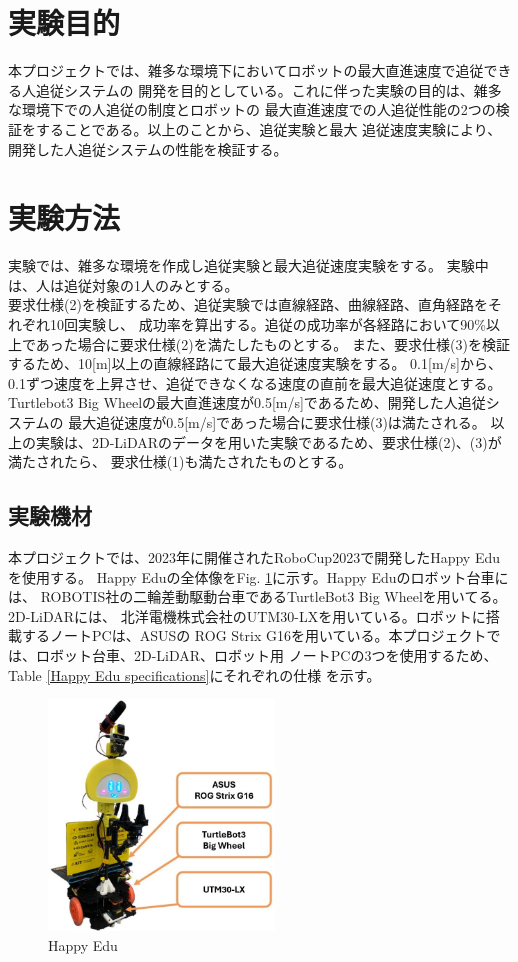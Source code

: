 \section{実験目的}
本プロジェクトでは、雑多な環境下においてロボットの最大直進速度で追従できる人追従システムの
開発を目的としている。これに伴った実験の目的は、雑多な環境下での人追従の制度とロボットの
最大直進速度での人追従性能の2つの検証をすることである。以上のことから、追従実験と最大
追従速度実験により、開発した人追従システムの性能を検証する。

\section{実験方法}
実験では、雑多な環境を作成し追従実験と最大追従速度実験をする。
実験中は、人は追従対象の1人のみとする。\\ \indent
要求仕様(2)を検証するため、追従実験では直線経路、曲線経路、直角経路をそれぞれ10回実験し、
成功率を算出する。追従の成功率が各経路において90\%以上であった場合に要求仕様(2)を満たしたものとする。
また、要求仕様(3)を検証するため、10[m]以上の直線経路にて最大追従速度実験をする。
0.1[m/s]から、0.1ずつ速度を上昇させ、追従できなくなる速度の直前を最大追従速度とする。
Turtlebot3 Big Wheelの最大直進速度が0.5[m/s]であるため、開発した人追従システムの
最大追従速度が0.5[m/s]であった場合に要求仕様(3)は満たされる。
以上の実験は、2D-LiDARのデータを用いた実験であるため、要求仕様(2)、(3)が満たされたら、
要求仕様(1)も満たされたものとする。

\subsection{実験機材}
本プロジェクトでは、2023年に開催されたRoboCup2023で開発したHappy Eduを使用する。
Happy Eduの全体像をFig. \ref{Happy Edu}に示す。Happy Eduのロボット台車には、
ROBOTIS社の二輪差動駆動台車であるTurtleBot3 Big Wheelを用いてる。2D-LiDARには、
北洋電機株式会社のUTM30-LXを用いている。ロボットに搭載するノートPCは、ASUSの
ROG Strix G16を用いている。本プロジェクトでは、ロボット台車、2D-LiDAR、ロボット用
ノートPCの3つを使用するため、Table \ref{Happy Edu specifications}にそれぞれの仕様
を示す。

\begin{figure}[h]
  \begin{center}
  \includegraphics[width=60mm,clip]{figure/Happy_Edu.jpg}
  \caption{Happy Edu}
  \label{Happy Edu}
  \end{center}
\end{figure}

